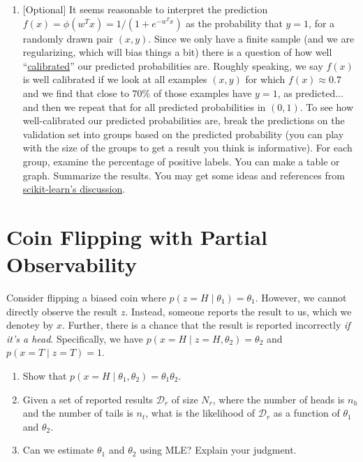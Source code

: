 \documentclass{article}
\theoremstyle{plain}
\theoremstyle{definition}
\begin{document}
\begin{enumerate}
\item {[}Optional{]} 
It seems reasonable to interpret the prediction $f(x)=\phi(w^{T}x)=1/(1+e^{-w^{T}x})$
as the probability that $y=1$, for a randomly drawn pair $\left(x,y\right)$.
Since we only have a finite sample (and we are regularizing, which
will bias things a bit) there is a question of how well ``\href{https://en.wikipedia.org/wiki/Calibration_(statistics)}{calibrated}''
our predicted probabilities are. Roughly speaking, we say $f(x)$
is well calibrated if we look at all examples $\left(x,y\right)$
for which $f(x)\approx0.7$ and we find that close to $70\%$ of those
examples have $y=1$, as predicted... and then we repeat that for
all predicted probabilities in $\left(0,1\right)$. To see how well-calibrated
our predicted probabilities are, break the predictions on the validation
set into groups based on the predicted probability (you can play with
the size of the groups to get a result you think is informative).
For each group, examine the percentage of positive labels. You can
make a table or graph. Summarize the results. You may get some ideas
and references from \href{http://scikit-learn.org/stable/modules/calibration.html}{scikit-learn's discussion}. 
\setcounter{saveenum}{\value{enumi}}
\end{enumerate}
\section{Coin Flipping with Partial Observability}
Consider flipping a biased coin where $p(z=H\mid \theta_1) = \theta_1$.
However, we cannot directly observe the result $z$.
Instead, someone reports the result to us,
which we denotey by $x$.
Further, there is a chance that the result is reported incorrectly \emph{if it's a head}.
Specifically, we have $p(x=H\mid z=H, \theta_2) = \theta_2$
and $p(x=T\mid z=T) = 1$.

\begin{enumerate}
  \setcounter{enumi}{\value{saveenum}}
\item Show that $p(x=H\mid \theta_1, \theta_2) = \theta_1 \theta_2$.


\item Given a set of reported results $\mathcal{D}_r$ of size $N_r$, where the number of heads is $n_h$ and the number of tails is $n_t$, what is the likelihood of $\mathcal{D}_r$ as a function of $\theta_1$ and $\theta_2$.


\item Can we estimate $\theta_1$ and $\theta_2$ using MLE? Explain your judgment.


\setcounter{saveenum}{\value{enumi}}
\end{enumerate}
\end{document}
